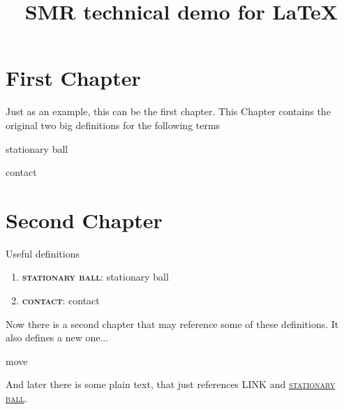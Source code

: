 \documentclass[fontsize=11pt, paper=a4]{report}
\newcommand{\refformat}[1]{{\textsc{#1}}}			 %
\newcommand{\defformat}[1]{{\textbf{\refformat{#1}}}}%
\newcommand{\dtterm}[1]{
\begin{Definition}[name=\defformat{#1}]
	\label{d:#1}
	 \glsdesc*{#1} %
\end{Definition}
}
\newcommand{\dref}[1]{\refformat{\hyperref[d:#1]{#1}}} %
\newcommand{\gref}[1]{\refformat{LINK\glossentryname{#1}}} %
\newcommand{\tterm}[1]{
	\defformat{#1}: \glsdesc{#1}
}
\newcommand{\recap}[1]{\item{\tterm{#1}}}
\begin{document}
\title{SMR technical demo for \LaTeX}
\maketitle

\pagestyle{plain}%

\chapter{First Chapter}
Just as an example, this can be the first chapter. This Chapter contains the original two big definitions for the following terms
\dtterm{stationary ball}
\dtterm{contact}

\newpage

\chapter{Second Chapter}
Useful definitions
\begin{enumerate}
	\recap{stationary ball}
	\recap{contact}
\end{enumerate}
Now there is a second chapter that may reference some of these definitions. It also defines a new one...
\dtterm{move}
 And later there is some plain text, that just references \gref{move} and \dref{stationary ball}.


\clearpage

\printglossary[title=Definitions, toctitle=List of terms]%
\end{document}
